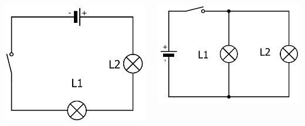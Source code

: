 \documentclass[xcolor={dvipsnames}]{beamer}
\begin{document}
\begin{frame}

	
	\begin{columns}
		\begin{column}{0.5\textwidth}
			\begin{center}
				\includegraphics[scale=0.15]{../img/serie}
			\end{center}
		\end{column}
	
		\begin{column}{0.5\textwidth}
			\begin{center}
				\includegraphics[scale=0.15]{../img/drv}
			\end{center}
		\end{column}
	\end{columns}
\end{frame}
\end{document}
